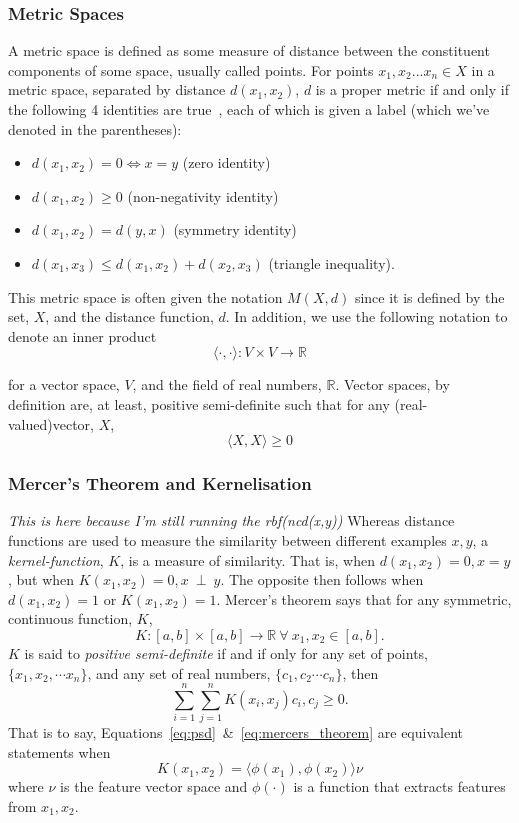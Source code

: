 \documentclass[conference]{IEEEtran}
\newcommand{\cm}[1]{\textit{{\color{blue}#1}}}
\begin{document}
\subsubsection{Metric Spaces}

A metric space is defined as some measure of distance between the constituent components of some space, usually called points.  For points $x_1,x_2...x_n \in X$ in a metric space, separated by distance $d(x_1,x_2)$, $d$ is a proper metric if and only if the following 4 identities are true~\cite{metrics}, each of which is given a label (which we've denoted in the parentheses):

\label{metric_spaces}
\begin{itemize}
    \item $d(x_1,x_2) = 0 \iff x = y$ (zero identity)
    \item $d(x_1,x_2) \geq 0$ (non-negativity identity)
    \item $d(x_1,x_2) = d(y, x)$ (symmetry identity)
    \item $d(x_1, x_3) \leq d(x_1,x_2) + d(x_2,x_3)$ (triangle inequality).
\end{itemize}
This metric space is often given the notation $M(X,d)$ since it is defined by the set, $X$, and the distance function, $d$.
In addition, we use the following notation to denote an inner product
$$
\langle \cdot , \cdot \rangle : V \times V \rightarrow \mathbb{R}
$$

for a vector space, $V$, and the field of real numbers, $\mathbb{R}$. 
Vector spaces, by definition are, at least, positive semi-definite such that for any (real-valued)vector, $X$, 
\begin{equation}
\langle X, X \rangle \geq 0
\label{eq:psd}
\end{equation}

\subsubsection{Mercer's Theorem and Kernelisation}
\cm{This is here because I'm still running the rbf(ncd(x,y))}
Whereas distance functions are used to measure the similarity between different examples $x,y$, a \textit{kernel-function}, $K$, is a measure of similarity. That is, when $d(x_1,x_2) = 0, x = y$ , but when $K(x_1,x_2) = 0, x~\perp~y$. The opposite then follows when $d(x_1,x_2)=1$ or $K(x_1,x_2)=1$. Mercer's theorem says that for any symmetric, continuous function, $K$,
$$
K : [a, b] \times [a, b] \rightarrow \mathbb{R}~\forall~x_1,x_2 \in [a,b].
$$
$K$ is said to \textit{positive semi-definite} if and if only for any set of points, $\{x_1, x_2, \cdots x_n\}$, and any set of real numbers, $\{ c_1, c_2 \cdots c_n\}$, then
\begin{equation}
\sum_{i=1}^n \sum_{j=1}^n K(x_i, x_j) c_i, c_j \geq 0.
\label{eq:mercers_theorem}
\end{equation}
That is to say, Equations~\ref{eq:psd}~\&~\ref{eq:mercers_theorem} are equivalent statements when 
$$
K(x_1, x_2) = \langle \phi(x_1), \phi(x_2) \rangle \nu
$$
where $\nu$ is the feature vector space and $\phi(\cdot)$ is a function that extracts features from $x_1,x_2$.
\end{document}

